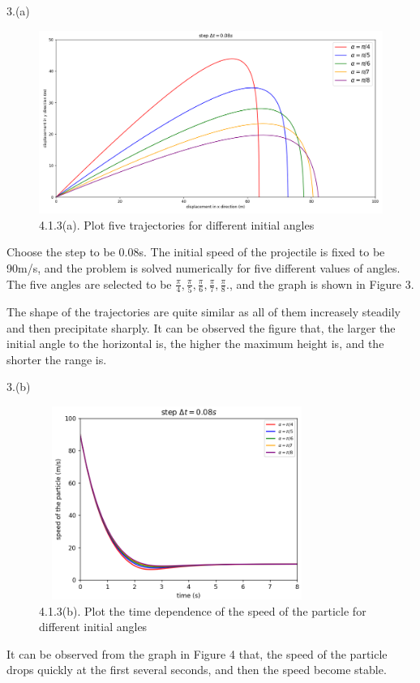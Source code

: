 \documentclass{book}
\begin{document}
{\Large 3.(a)}
\begin{figure}[H]
  \centering
  \includegraphics[scale=0.3]{project4.1.3(a).png}
  \caption{4.1.3(a). Plot five trajectories for different initial angles}
\end{figure}
Choose the step to be 0.08s.
The initial speed of the projectile is fixed to be 90m/s, and the problem is solved numerically for five different values of angles.
  {The five angles are selected to be $\frac{\pi}{4},\frac{\pi}{5},\frac{\pi}{6},\frac{\pi}{7},\frac{\pi}{8}.$}, and the graph is shown in Figure 3.

The shape of the trajectories are quite similar as all of them increasely steadily and then precipitate sharply.
It can be observed the figure that, the larger the initial angle to the horizontal is, the higher the maximum height is, and the shorter the range is.

\newpage
{\Large 3.(b)}
\begin{figure}[H]
  \centering
  \includegraphics[width=9cm,height=6.3cm]{project4.1.3(b).png}
  \caption{4.1.3(b). Plot the time dependence of the speed of the particle for different initial angles}
\end{figure}
It can be observed from the graph in Figure 4 that, the speed of the particle drops quickly at the first several seconds, and then the speed become stable.
\end{document}
